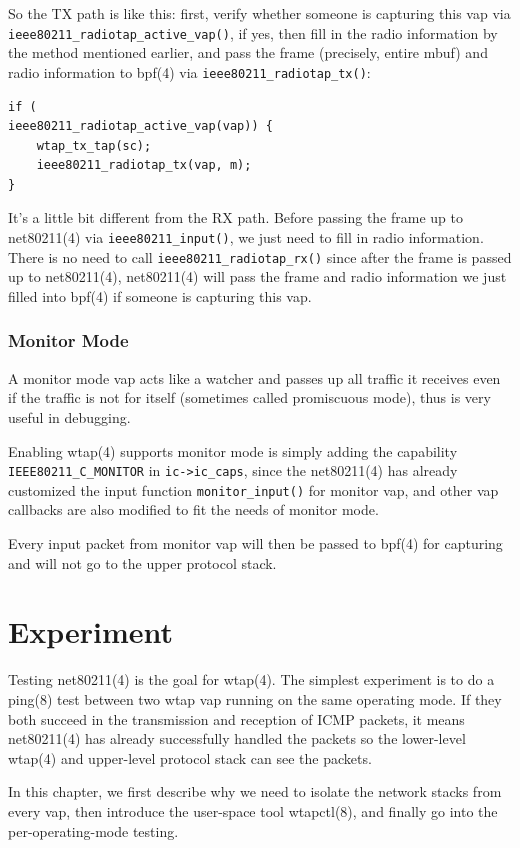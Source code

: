 \documentclass[conference]{IEEEtran}
\begin{document}
So the TX path is like this: first, verify whether someone is capturing this vap via \lstinline{ieee80211_radiotap_active_vap()}, if yes, then fill in the radio information by the method mentioned earlier, and pass the frame (precisely, entire mbuf) and radio information to bpf(4) via \lstinline{ieee80211_radiotap_tx()}:

\begin{lstlisting}
if (
ieee80211_radiotap_active_vap(vap)) {
    wtap_tx_tap(sc);
    ieee80211_radiotap_tx(vap, m);
}
\end{lstlisting}

It's a little bit different from the RX path. Before passing the frame up to net80211(4) via \lstinline{ieee80211_input()}, we just need to fill in radio information. There is no need to call \lstinline{ieee80211_radiotap_rx()} since after the frame is passed up to net80211(4), net80211(4) will pass the frame and radio information we just filled into bpf(4) if someone is capturing this vap.

\subsubsection{Monitor Mode}
A monitor mode vap acts like a watcher and passes up all traffic it receives even if the traffic is not for itself (sometimes called promiscuous mode), thus is very useful in debugging. 

Enabling wtap(4) supports monitor mode is simply adding the capability \lstinline{IEEE80211_C_MONITOR} in \lstinline{ic->ic_caps}, since the net80211(4) has already customized the input function \lstinline{monitor_input()} for monitor vap, and other vap callbacks are also modified to fit the needs of monitor mode. 

Every input packet from monitor vap will then be passed to bpf(4) for capturing and will not go to the upper protocol stack.

\section{Experiment}
Testing net80211(4) is the goal for wtap(4). The simplest experiment is to do a ping(8) test between two wtap vap running on the same operating mode. If they both succeed in the transmission and reception of ICMP packets, it means net80211(4) has already successfully handled the packets so the lower-level wtap(4) and upper-level protocol stack can see the packets.

In this chapter, we first describe why we need to isolate the network stacks from every vap, then introduce the user-space tool wtapctl(8), and finally go into the per-operating-mode testing.
\end{document}
